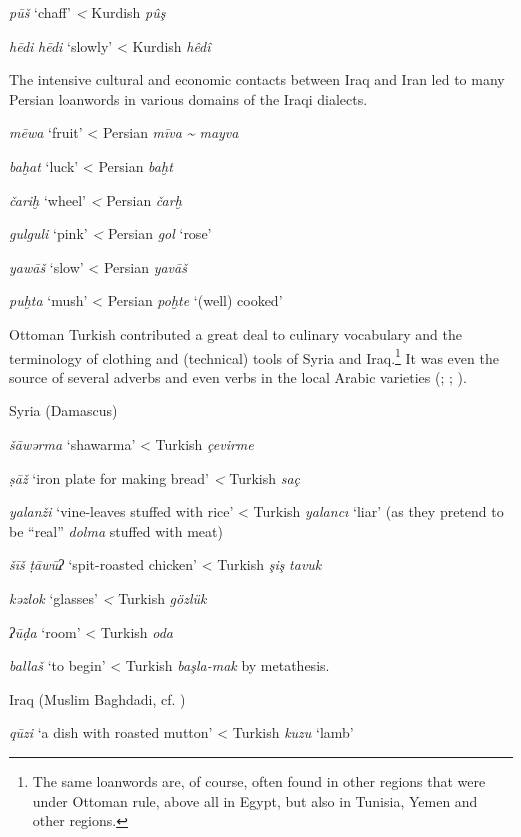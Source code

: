 \documentclass[output=paper]{langsci/langscibook}
\begin{document}
\textit{pūš} ‘chaff’ \textit{<} Kurdish \textit{pûş}

\textit{hēdi} \textit{hēdi} ‘slowly’ < Kurdish \textit{hêdî} \citep[68]{Jastrow1979}
\z

The intensive cultural and economic contacts between Iraq and Iran led to many Persian loanwords in various domains of the Iraqi dialects. 

\ea
\textit{mēwa} ‘fruit’ < Persian \textit{mīva} \textit{{\textasciitilde} mayva}

\textit{baḫat} ‘luck’ < Persian \textit{baḫt}

\textit{čariḫ} ‘wheel’ \textit{<} Persian \textit{čarḫ} 

\textit{gulguli} ‘pink’ \textit{<} Persian \textit{gol} ‘rose’

\textit{yawāš} ‘slow’ < Persian \textit{yavāš}

\textit{puḫta} ‘mush’ < Persian \textit{poḫte} ‘(well) cooked’
\z

Ottoman Turkish contributed a great deal to culinary vocabulary and the terminology of clothing and (technical) tools of Syria and Iraq.\footnote{The same loanwords are, of course, often found in other regions that were under Ottoman rule, above all in Egypt, but also in Tunisia, Yemen and other regions.} It was even the source of several adverbs and even verbs in the local Arabic varieties (\citealt{Halasi-Kun1969}; \citeyear{Halasi-Kun1973}; \citeyear{Halasi-Kun1982}).

\ea
Syria (Damascus)

\textit{šāwərma} ‘shawarma’ < Turkish \textit{çevirme} 

\textit{ṣāž} ‘iron plate for making bread’ \textit{<} Turkish \textit{saç}

\textit{yalanži} ‘vine-leaves stuffed with rice’ < Turkish \textit{yalancı} ‘liar’ (as they pretend to be “real” \textit{dolma} stuffed with meat)

\textit{šīš} \textit{ṭāwūʔ} ‘spit-roasted chicken’ < Turkish \textit{şiş} \textit{tavuk}

\textit{kǝzlok} ‘glasses’ \textit{<} Turkish \textit{gözlük}

\textit{ʔūḍa} ‘room’ < Turkish \textit{oda}

\textit{ballaš} ‘to begin’ < Turkish \textit{başla-mak} by metathesis.
\z

\ea
Iraq (Muslim Baghdadi, cf. \citealt{Reinkowski1995}) 

\textit{qūzi} ‘a dish with roasted mutton’ < Turkish \textit{kuzu} ‘lamb’
\end{document}
